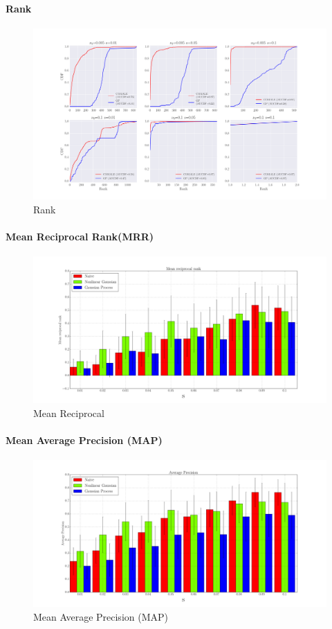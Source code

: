 \paragraph{Rank}
\begin{figure}[H]
  \centering
    \includegraphics[width=\textwidth]{rank}
  \caption{Rank}
  \label{fig:Fig3}
\end{figure}

\paragraph{Mean Reciprocal Rank(MRR)}
\begin{figure}[H]
  \centering
    \includegraphics[width=\textwidth]{mrr}
  \caption{Mean Reciprocal}
  \label{fig:Fig2}
\end{figure}


\paragraph{Mean Average Precision (MAP)}
\begin{figure}[hh]
  \centering
    \includegraphics[width=\textwidth]{ap}
  \caption{Mean Average Precision (MAP)}
  \label{fig:Fig5}
\end{figure}


